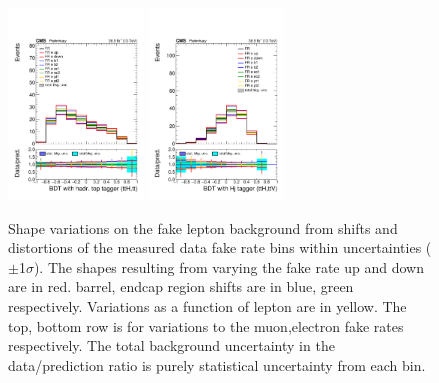 \begin{figure}[htb]
        \includegraphics[width=0.32\textwidth]{ch10_figs/kinMVA_2lss_e_ttbar_withBDTv8.pdf}
        \includegraphics[width=0.32\textwidth]{ch10_figs/kinMVA_2lss_e_ttV_withHj.pdf}
        \caption[Variations in discrminant shape due to fake rate systematics]{Shape variations on the fake lepton background from shifts and distortions
          of the measured data fake rate bins within uncertainties ($\pm$1$\sigma$). 
          The shapes resulting from varying the fake rate up and down are in red. barrel, endcap region shifts are in blue, green respectively. Variations as a function
          of lepton \pt are in yellow. The top, bottom row is for variations to the muon,electron fake rates respectively. The total background uncertainty in the
          data/prediction ratio is purely statistical uncertainty from each bin.}
        \label{fig:FRvars_shape}
\end{figure}

